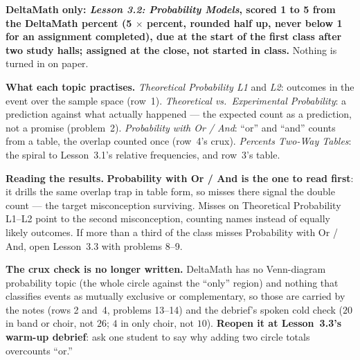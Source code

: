 \documentclass[10pt]{article}
\begin{document}
\begin{teachernote}[Homework]
\textbf{DeltaMath only: \emph{Lesson 3.2: Probability Models}, scored 1 to 5 from the DeltaMath
percent (5 $\times$ percent, rounded half up, never below 1 for an assignment completed), due at
the start of the first class after two study halls; assigned at the close, not started in
class.} Nothing is turned in on paper.

\textbf{What each topic practises.} \emph{Theoretical Probability L1} and \emph{L2}: outcomes in
the event over the sample space (row~1). \emph{Theoretical vs.\ Experimental Probability}: a
prediction against what actually happened --- the expected count as a prediction, not a promise
(problem~2). \emph{Probability with Or / And}: ``or'' and ``and'' counts from a table, the overlap
counted once (row~4's crux). \emph{Percents Two-Way Tables}: the spiral to Lesson~3.1's relative
frequencies, and row~3's table.

\textbf{Reading the results.} \textbf{Probability with Or / And is the one to read first}: it
drills the same overlap trap in table form, so misses there signal the double count --- the
target misconception surviving. Misses on Theoretical Probability L1--L2 point to the second
misconception, counting names instead of equally likely outcomes. If more than a third of the
class misses Probability with Or / And, open Lesson~3.3 with problems 8--9.

\textbf{The crux check is no longer written.} DeltaMath has no Venn-diagram probability topic
(the whole circle against the ``only'' region) and nothing that classifies events as mutually
exclusive or complementary, so those are carried by the notes (rows 2 and~4, problems 13--14) and
the debrief's spoken cold check ($20$ in band or choir, not $26$; $4$ in only choir, not $10$).
\textbf{Reopen it at Lesson~3.3's warm-up debrief}: ask one student to say why adding two circle
totals overcounts ``or.''
\end{teachernote}
\end{document}
